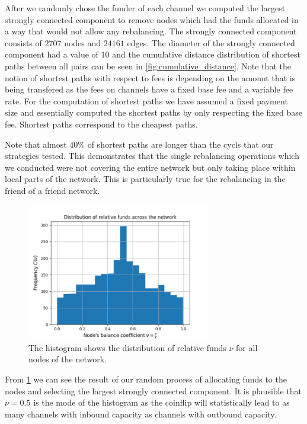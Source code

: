 \documentclass[a4paper]{paper}
\begin{document}
After we randomly chose the funder of each channel we computed the largest strongly connected component to remove nodes which had the funds allocated in a way that would not allow any rebalancing.
The strongly connected component consists of $2707$ nodes and $24161$ edges.
The diameter of the strongly connected component had a value of 10 and the cumulative distance distribution of shortest paths between all pairs can be seen in \cref{fig:cumulative_distance}.
Note that the notion of shortest paths with respect to fees is depending on the amount that is being transfered as the fees on channels have a fixed base fee and a variable fee rate.
For the computation of shortest paths we have assumed a fixed payment size and essentially computed the shortest paths by only respecting the fixed base fee.
Shortest paths correspond to the cheapest paths.

Note that almost $40\%$ of shortest paths are longer than the cycls that our strategies tested. 
This demonstrates that the single rebalancing operations which we conducted were not covering the entire network but only taking place within local parts of the network.
This is particularly true for the rebalancing in the friend of a friend network.

\begin{figure}
 \centering
 \includegraphics[width=8cm]{code/vs/fig/distribution_of_nus.png}
 \caption{The histogram shows the distribution of relative funds $\nu$ for all nodes of the network.}
 \label{fig:initial_funds}
\end{figure}
From \cref{fig:initial_funds} we can see the result of our random process of allocating funds to the nodes and selecting the largest strongly connected component.
It is plausible that $\nu=0.5$ is the mode of the histogram as the coinflip will statistically lead to as many channels with inbound capacity as channels with outbound capacity.
\end{document}
